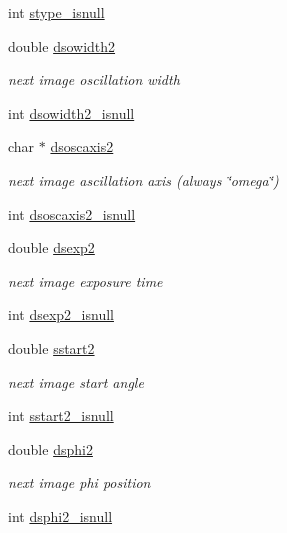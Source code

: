 \begin{DoxyCompactItemize}
int \hyperlink{structlspg__nextshot__struct_a79f48c452a4aca8506bae22f897c7441}{stype\-\_\-isnull}
\item 
double \hyperlink{structlspg__nextshot__struct_a5378e13735a5392a9fcd853ce8c9e929}{dsowidth2}
\begin{DoxyCompactList}\small\item\em next image oscillation width \end{DoxyCompactList}\item 
int \hyperlink{structlspg__nextshot__struct_a5ffd27b8063506fd54162658e5c2ce8a}{dsowidth2\-\_\-isnull}
\item 
char $\ast$ \hyperlink{structlspg__nextshot__struct_ac86005a6e90ff502da9e95b59d0b7a5f}{dsoscaxis2}
\begin{DoxyCompactList}\small\item\em next image ascillation axis (always \char`\"{}omega\char`\"{}) \end{DoxyCompactList}\item 
int \hyperlink{structlspg__nextshot__struct_a98e280e99ae847559bb82836df3c32d1}{dsoscaxis2\-\_\-isnull}
\item 
double \hyperlink{structlspg__nextshot__struct_a4d8c34309572875352ddabe9cc9001ee}{dsexp2}
\begin{DoxyCompactList}\small\item\em next image exposure time \end{DoxyCompactList}\item 
int \hyperlink{structlspg__nextshot__struct_a45091283dc073e5b7da2cfbe5a75fade}{dsexp2\-\_\-isnull}
\item 
double \hyperlink{structlspg__nextshot__struct_a8445cbd2206dc6d62b6bd433f5218c98}{sstart2}
\begin{DoxyCompactList}\small\item\em next image start angle \end{DoxyCompactList}\item 
int \hyperlink{structlspg__nextshot__struct_a240c8532d5ce48dbc872d5123a4e721c}{sstart2\-\_\-isnull}
\item 
double \hyperlink{structlspg__nextshot__struct_a98857616b6bbb6ba861e96b6b7551756}{dsphi2}
\begin{DoxyCompactList}\small\item\em next image phi position \end{DoxyCompactList}\item 
int \hyperlink{structlspg__nextshot__struct_a57a9c43be86188f65b96d59c2adec674}{dsphi2\-\_\-isnull}
\item 

\end{DoxyCompactItemize}
